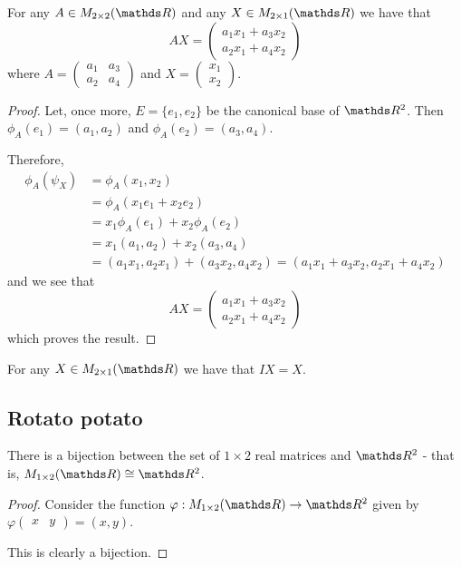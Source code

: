 \begin{lemma}
	For any $A\in M_{2\times 2}(\R)$ and any $X\in M_{2\times 1}(\R)$ we have that \[AX=\begin{pmatrix}
	a_1x_1+a_3x_2\\
	a_2x_1+a_4x_2
	\end{pmatrix}\]where $A=\begin{pmatrix}
	a_1&a_3\\
	a_2&a_4
	\end{pmatrix}$ and $X=\begin{pmatrix}
	x_1\\x_2
	\end{pmatrix}$.
\end{lemma}
\begin{proof}
	Let, once more, $E=\{e_1,e_2\}$ be the canonical base of $\R^2$. Then $\phi_A(e_1)=(a_1,a_2)$ and $\phi_A(e_2)=(a_3,a_4)$.
	
	Therefore,
	\begin{align*}
		\phi_A(\psi_X)&=\phi_A(x_1,x_2)\\
		&=\phi_A(x_1e_1+x_2e_2)\\
		&=x_1\phi_A(e_1)+x_2\phi_A(e_2)\\
		&=x_1(a_1,a_2)+x_2(a_3,a_4)\\
		&=(a_1x_1,a_2x_1)+(a_3x_2,a_4x_2)=(a_1x_1+a_3x_2,a_2x_1+a_4x_2)
	\end{align*}and we see that \[AX=\begin{pmatrix}
	a_1x_1+a_3x_2\\
	a_2x_1+a_4x_2
	\end{pmatrix}\]which proves the result.
\end{proof}
\begin{cor}
	For any $X\in M_{2\times 1}(\R)$ we have that $IX=X$.
\end{cor}

\newpage
\subsection{Rotato potato}

\begin{prop}
	There is a bijection between the set of $1\times 2$ real matrices and $\R^2$ - that is, $M_{1\times 2}(\R)\iso \R^2$.
\end{prop}
\begin{proof}
	Consider the function $\varphi:M_{1\times 2}(\R)\to\R^2$ given by $\varphi\begin{pmatrix}
	x & y
	\end{pmatrix}=(x,y)$.
	
	This is clearly a bijection.
\end{proof}

